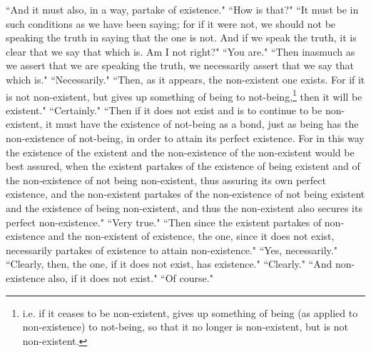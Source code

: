 \documentclass[letterpaper,12pt]{article}
\newcommand{\stephpag}[1]{\marginnote{\small\itshape\fontfamily{ppl}\selectfont #1}}
\begin{document}
``And it must also, in a way, partake of existence." ``How is that?" ``It must be in such conditions as we have been saying; for if it were not, we should not be speaking the truth in saying that the one is not. And if we speak the truth, it is clear that we say that which is. Am I not right?" ``You are." ``Then inasmuch as we assert that we are speaking the truth, \stephpag{162 a} we necessarily assert that we say that which is." ``Necessarily." ``Then, as it appears, the non-existent one exists. For if it is not non-existent, but gives up something of being to not-being,\footnote{i.e. if it ceases to be non-existent, gives up something of being (as applied to non-existence) to not-being, so that it no longer is non-existent, but is not non-existent.} then it will be existent." ``Certainly." ``Then if it does not exist and is to continue to be non-existent, it must have the existence of not-being as a bond, just as being has the non-existence of not-being, in order to attain its perfect existence. For in this way the existence of the existent and the non-existence of the non-existent would be best assured, when the existent partakes of the existence of being existent and of the non-existence of not being non-existent, \stephpag{b} thus assuring its own perfect existence, and the non-existent partakes of the non-existence of not being existent and the existence of being non-existent, and thus the non-existent also secures its perfect non-existence." ``Very true." ``Then since the existent partakes of non-existence and the non-existent of existence, the one, since it does not exist, necessarily partakes of existence to attain non-existence." ``Yes, necessarily." ``Clearly, then, the one, if it does not exist, has existence." ``Clearly." ``And non-existence also, if it does not exist." ``Of course."
\end{document}
